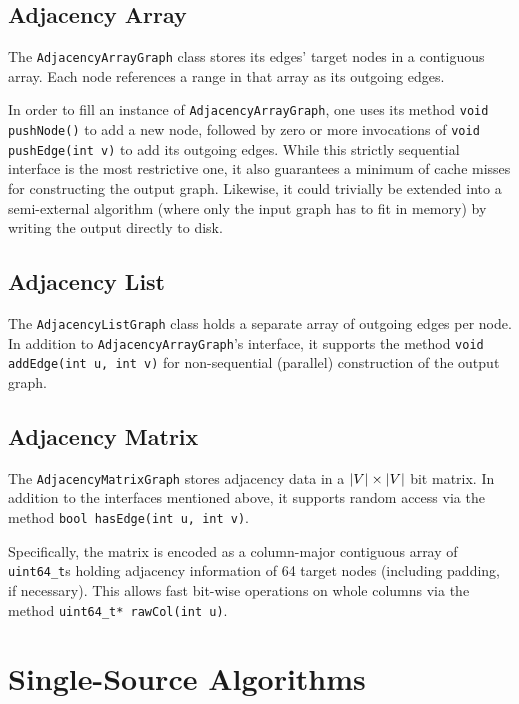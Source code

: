 \documentclass[12pt,a4paper,twoside]{article}
\begin{document}
\subsection{Adjacency Array}

The \verb|AdjacencyArrayGraph| class stores its edges' target nodes in a contiguous array. Each node references a range in that array as its outgoing edges.

In order to fill an instance of \verb|AdjacencyArrayGraph|, one uses its method \verb|void pushNode()| to add a new node, followed by zero or more invocations of \verb|void pushEdge(int v)| to add its outgoing edges. While this strictly sequential interface is the most restrictive one, it also guarantees a minimum of cache misses for constructing the output graph. Likewise, it could trivially be extended into a semi-external algorithm (where only the input graph has to fit in memory) by writing the output directly to disk.

\subsection{Adjacency List}

The \verb|AdjacencyListGraph| class holds a separate array of outgoing edges per node. In addition to \verb|AdjacencyArrayGraph|'s interface, it supports the method \verb|void addEdge(int u, int v)| for non-sequential (\eg parallel) construction of the output graph.

\subsection{Adjacency Matrix}

The \verb|AdjacencyMatrixGraph| stores adjacency data in a $\left|V\right| \times \left|V\right|$ bit matrix. In addition to the interfaces mentioned above, it supports random access via the method \verb|bool hasEdge(int u, int v)|.

Specifically, the matrix is encoded as a column-major contiguous array of \verb|uint64_t|s holding adjacency information of 64 target nodes (including padding, if necessary). This allows fast bit-wise operations on whole columns via the method \verb|uint64_t* rawCol(int u)|.

\section{Single-Source Algorithms}
\end{document}
